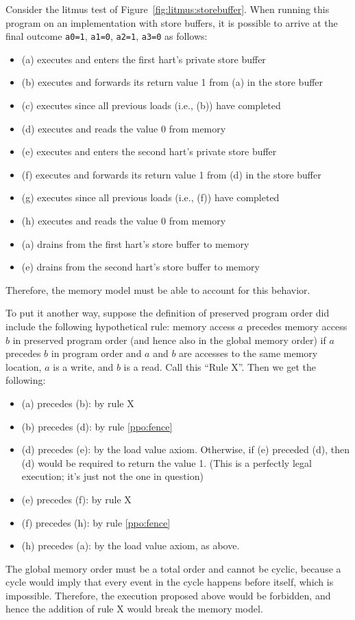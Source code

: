 Consider the litmus test of Figure~\ref{fig:litmus:storebuffer}.
When running this program on an implementation with store buffers, it is possible to arrive at the final outcome
{\tt a0=1}, {\tt a1=0}, {\tt a2=1}, {\tt a3=0}
as follows:
\begin{itemize}
  \item (a) executes and enters the first hart's private store buffer
  \item (b) executes and forwards its return value 1 from (a) in the store buffer
  \item (c) executes since all previous loads (i.e., (b)) have completed
  \item (d) executes and reads the value 0 from memory
  \item (e) executes and enters the second hart's private store buffer
  \item (f) executes and forwards its return value 1 from (d) in the store buffer
  \item (g) executes since all previous loads (i.e., (f)) have completed
  \item (h) executes and reads the value 0 from memory
  \item (a) drains from the first hart's store buffer to memory
  \item (e) drains from the second hart's store buffer to memory
\end{itemize}
Therefore, the memory model must be able to account for this behavior.

To put it another way, suppose the definition of preserved program order did include the following hypothetical rule:
memory access $a$ precedes memory access $b$ in preserved program order (and hence also in the global memory order) if $a$ precedes $b$ in program order and $a$ and $b$ are accesses to the same memory location, $a$ is a write, and $b$ is a read.  Call this ``Rule X''.  Then we get the following:

\begin{itemize}
  \item (a) precedes (b): by rule X
  \item (b) precedes (d): by rule \ref{ppo:fence}
  \item (d) precedes (e): by the load value axiom.  Otherwise, if (e) preceded (d), then (d) would be required to return the value 1.  (This is a perfectly legal execution; it's just not the one in question)
  \item (e) precedes (f): by rule X
  \item (f) precedes (h): by rule \ref{ppo:fence}
  \item (h) precedes (a): by the load value axiom, as above.
\end{itemize}
The global memory order must be a total order and cannot be cyclic, because a cycle would imply that every event in the cycle happens before itself, which is impossible.
Therefore, the execution proposed above would be forbidden, and hence the addition of rule X would break the memory model.

